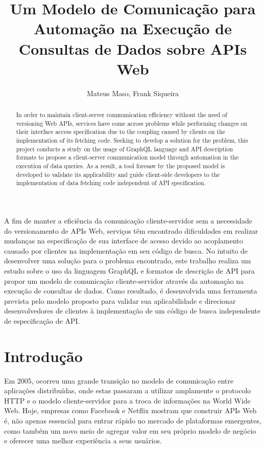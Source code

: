 \documentclass[12pt]{article}
\title{Um Modelo de Comunicação para Automação na Execução de Consultas de Dados sobre APIs Web}
\author{Mateus Maso\inst{1}, Frank Siqueira\inst{2}}
\begin{document}
  \maketitle
  \begin{abstract}
    In order to maintain client-server communication efficiency without the need of versioning Web APIs, services have come across problems while performing changes on their interface access specification due to the coupling caused by clients on the implementation of its fetching code. Seeking to develop a solution for the problem, this project conducts a study on the usage of GraphQL language and API description formats to propose a client-server communication model through automation in the execution of data queries. As a result, a tool foresaw by the proposed model is developed to validate its applicability and guide client-side developers to the implementation of data fetching code independent of API specification.
  \end{abstract}

  \begin{resumo}
    A fim de manter a eficiência da comunicação cliente-servidor sem a necessidade do versionamento de APIs Web, serviços têm encontrado dificuldades em realizar mudanças na especificação de sua interface de acesso devido ao acoplamento causado por clientes na implementação em seu código de busca. No intuito de desenvolver uma solução para o problema encontrado, este trabalho realiza um estudo sobre o uso da linguagem GraphQL e formatos de descrição de API para propor um modelo de comunicação cliente-servidor através da automação na execução de consultas de dados. Como resultado, é desenvolvida uma ferramenta prevista pelo modelo proposto para validar sua aplicabilidade e direcionar desenvolvedores de clientes à implementação de um código de busca independente de especificação de API.
  \end{resumo}

  \section{Introdução}

  Em 2005, ocorreu uma grande transição no modelo de comunicação entre aplicações distribuídas, onde estas passaram a utilizar amplamente o protocolo HTTP e o modelo cliente-servidor para a troca de informações na World Wide Web. Hoje, empresas como Facebook e Netflix mostram que construir APIs Web é, não apenas essencial para entrar rápido no mercado de plataformas emergentes, como também um novo meio de agregar valor em seu próprio modelo de negócio e oferecer uma melhor experiência a seus usuários. \cite{Duvander2013-2, Art2016}
\end{document}
